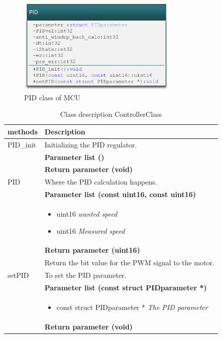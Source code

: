 \begin{figure}[H]
	\centering
	\includegraphics [width=3in]{Software/Pictures/class-diagram-PID.png}
	\caption{PID class of MCU}
	\label{fig:Class_diagram_MCU_PID}
\end{figure}

\begin{table}[H]
	\centering
	\begin{tabular}{|p{5 cm}|p{10 cm}|}
		\hline
		\textbf{methods} & \textbf{Description} \\ \hline
		
		PID\_init
		& Initializing the PID regulator.
		\\ & \textbf{Parameter list ()}
		\\ & \textbf{Return parameter (void)}
		\\ \hline
		
		PID
		& Where the PID calculation happens.
		\\ & \textbf{Parameter list (const uint16, const uint16)}
		\\ & \begin{itemize}
			\item {\large uint16}
			\subitem \textit{wanted speed}
			\item {\large uint16}
			\subitem \textit{Measured speed}
		\end{itemize}
		\\ & \textbf{Return parameter (uint16)}
		\\ & Return the bit value for the PWM signal to the motor.
		\\ \hline
		
		setPID
		& To set the PID parameter.
		\\ & \textbf{Parameter list (const struct PIDparameter *)}
		\\ & \begin{itemize}
			\item {\large const struct PIDparameter *}
			\subitem \textit{The PID parameter}
		\end{itemize}
		\\ & \textbf{Return parameter (void)}
		\\ \hline
		
	\end{tabular}
	\caption{Class description ControllerClass}
	\label{table:Class_description_MCU_PID}
\end{table}

